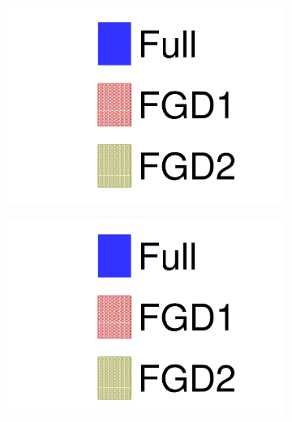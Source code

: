 \begin{figure}[h]
	\begin{subfigure}[t]{0.32\textwidth}
		\includegraphics[width=\textwidth, trim={0mm 0mm 0mm 0mm}, clip, page=4]{figures/mach3/data/alt/try_2017_fit_on_sk_spectra_posterior_sk_error_fgd1only_spectra_posterior_sk_error_fgd2only_spectra}
	\end{subfigure}
	\begin{subfigure}[t]{0.32\textwidth}
		\includegraphics[width=\textwidth, trim={0mm 0mm 0mm 0mm}, clip, page=5]{figures/mach3/data/alt/try_2017_fit_on_sk_spectra_posterior_sk_error_fgd1only_spectra_posterior_sk_error_fgd2only_spectra}
	\end{subfigure}
	\begin{subfigure}[t]{0.32\textwidth}

\end{subfigure}
\end{figure}
